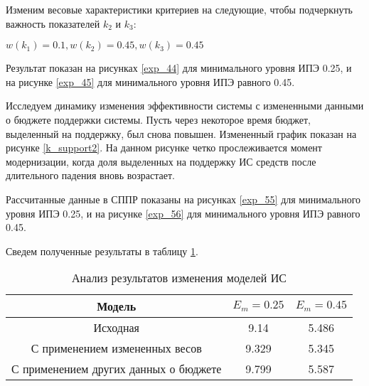 Изменим весовые характеристики критериев на следующие, чтобы подчеркнуть важность показателей $k_2$ и $k_3$:

\begin{center}
    $w(k_1)=0.1, w(k_2)=0.45,w(k_3)=0.45$
\end{center}

Результат показан на рисунках \ref{exp_44} для минимального уровня ИПЭ 0.25, и на рисунке \ref{exp_45} для минимального уровня ИПЭ равного 0.45.



Исследуем динамику изменения эффективности системы с измененными данными о бюджете поддержки системы.
Пусть через некоторое время бюджет, выделенный на поддержку, был снова повышен.
Измененный график показан на рисунке \ref{k_support2}.
На данном рисунке четко прослеживается момент модернизации, когда доля выделенных на поддержку ИС средств после длительного падения вновь возрастает.


Рассчитанные данные в СППР показаны на рисунках \ref{exp_55} для минимального уровня ИПЭ 0.25, и на рисунке \ref{exp_56} для минимального уровня ИПЭ равного 0.45.



Сведем полученные результаты в таблицу \ref{table:is_results}.

\begin{table}[H]
    \centering
    \caption{Анализ результатов изменения моделей ИС}\label{table:is_results}
    \begin{tabular}{|c|c|c|}
    \hline Модель & $E_m=0.25$ & $E_m=0.45$ \\
    \hline Исходная & 9.14 & 5.486 \\
    \hline С применением измененных весов & 9.329 & 5.345 \\
    \hline С применением других данных о бюджете & 9.799 & 5.587 \\
    \hline
    \end{tabular}
\end{table}

